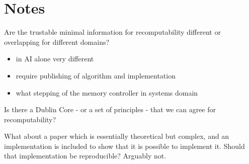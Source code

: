 \documentclass[a4paper,11pt]{article}
\begin{document}
\section*{Notes}


Are the trustable minimal information for recomputability  different or overlapping for different domains?
\begin{itemize}
\item in AI alone very different
\item require publishing of algorithm and implementation
\item what stepping of the memory controller in systems domain
\end{itemize}

Is there a Dublin Core - or a set of principles - that we can agree
for recomputability?

What about a paper which is essentially theoretical but complex, and
an implementation is included to show that it is possible to implement
it. Should that implementation be reproducible? Arguably not.




\end{document}
